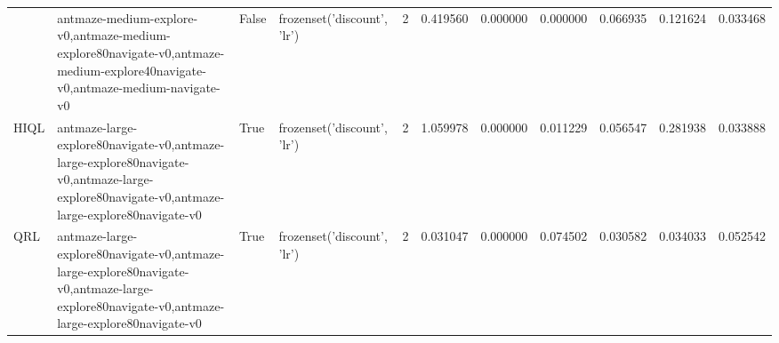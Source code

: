 \begin{tabular}{llllrrrrrrr}
\cline{2-11} \cline{3-11}
 & antmaze-medium-explore-v0,antmaze-medium-explore80navigate-v0,antmaze-medium-explore40navigate-v0,antmaze-medium-navigate-v0 & False & frozenset({'discount', 'lr'}) & 2 & 0.419560 & 0.000000 & 0.000000 & 0.066935 & 0.121624 & 0.033468 \\
\cline{1-11} \cline{2-11} \cline{3-11}
HIQL & antmaze-large-explore80navigate-v0,antmaze-large-explore80navigate-v0,antmaze-large-explore80navigate-v0,antmaze-large-explore80navigate-v0 & True & frozenset({'discount', 'lr'}) & 2 & 1.059978 & 0.000000 & 0.011229 & 0.056547 & 0.281938 & 0.033888 \\
\cline{1-11} \cline{2-11} \cline{3-11}
QRL & antmaze-large-explore80navigate-v0,antmaze-large-explore80navigate-v0,antmaze-large-explore80navigate-v0,antmaze-large-explore80navigate-v0 & True & frozenset({'discount', 'lr'}) & 2 & 0.031047 & 0.000000 & 0.074502 & 0.030582 & 0.034033 & 0.052542 \\
\cline{1-11} \cline{2-11} \cline{3-11}
\bottomrule
\end{tabular}

